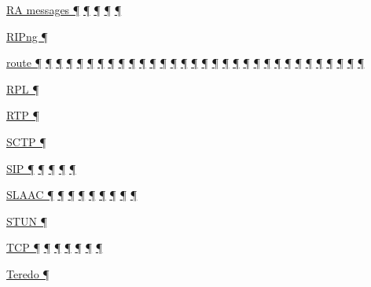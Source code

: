 \documentclass[
]{article}
\begin{document}
\hyperref[address-resolution]{RA messages ¶}
\hyperref[auto-configuration]{¶} \hyperref[managed-configuration]{¶}
\hyperref[routing]{¶} \hyperref[multi-prefix-operation]{¶}

\hyperref[routing]{RIPng ¶}

\hyperref[why-version-6]{route ¶} \hyperref[ipv6-basic-technology]{¶}
\hyperref[address-resolution]{¶} \hyperref[addresses]{¶}
\hyperref[auto-configuration]{¶} \hyperref[dns]{¶}
\hyperref[extension-headers-and-options]{¶}
\hyperref[layer-2-functions]{¶} \hyperref[managed-configuration]{¶}
\hyperref[packet-format]{¶} \hyperref[routing]{¶}
\hyperref[traffic-class-and-flow-label]{¶} \hyperref[further-reading]{¶}
\hyperref[coexistence-with-legacy-ipv4]{¶}
\hyperref[dual-stack-scenarios]{¶}
\hyperref[ipv6-primary-differences-from-ipv4]{¶}
\hyperref[translation-and-ipv4-as-a-service]{¶} \hyperref[tunnels]{¶}
\hyperref[filtering]{¶} \hyperref[layer-2-considerations]{¶}
\hyperref[topology-obfuscation]{¶} \hyperref[network-design]{¶}
\hyperref[address-planning]{¶} \hyperref[management-and-operations]{¶}
\hyperref[address-and-prefix-management]{¶}
\hyperref[energy-consumption]{¶} \hyperref[multi-prefix-operation]{¶}
\hyperref[multihoming]{¶} \hyperref[routing-operation]{¶}
\hyperref[deployment-by-carriers]{¶}
\hyperref[deployment-in-the-enterprise]{¶}
\hyperref[deployment-in-the-home]{¶}

\hyperref[routing]{RPL ¶}

\hyperref[transport-protocols]{RTP ¶}

\hyperref[transport-protocols]{SCTP ¶}

\hyperref[why-version-6]{SIP ¶} \hyperref[transport-protocols]{¶}
\hyperref[dual-stack-scenarios]{¶}
\hyperref[translation-and-ipv4-as-a-service]{¶}
\hyperref[multihoming]{¶}

\hyperref[auto-configuration]{SLAAC ¶}
\hyperref[managed-configuration]{¶} \hyperref[routing]{¶}
\hyperref[ipv6-primary-differences-from-ipv4]{¶} \hyperref[security]{¶}
\hyperref[filtering]{¶} \hyperref[layer-2-considerations]{¶}
\hyperref[address-and-prefix-management]{¶}
\hyperref[multi-prefix-operation]{¶}

\hyperref[transport-protocols]{STUN ¶}

\hyperref[why-version-6]{TCP ¶} \hyperref[addresses]{¶}
\hyperref[extension-headers-and-options]{¶} \hyperref[packet-format]{¶}
\hyperref[traffic-class-and-flow-label]{¶}
\hyperref[transport-protocols]{¶} \hyperref[multihoming]{¶}

\hyperref[obsolete-techniques]{Teredo ¶}
\end{document}
